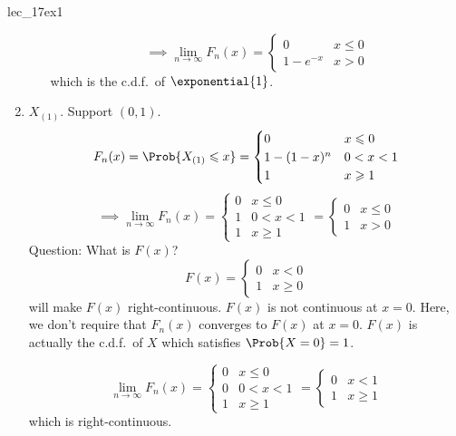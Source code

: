 \begin{Example}{}{lec_17ex1}
\begin{enumerate}[label=(\roman*)]
\begin{itemize}
                        \[ \implies
                            \lim\limits_{{n} \to {\infty}} F_n(x)=
                            \begin{cases}
                                0        & x\leqslant 0 \\
                                1-e^{-x} & x>0
                            \end{cases} \]
                        which is the c.d.f.\ of $ \exponential{1} $.
              \end{itemize}
        \item $ X_{(1)} $. Support $ (0,1) $.
              \[ F_n(x)=\Prob{X_{(1)}\leqslant x}=
                  \begin{cases}
                      0         & x\leqslant 0 \\
                      1-(1-x)^n & 0<x<1        \\
                      1         & x\geqslant 1
                  \end{cases} \]
              \[ \implies \lim\limits_{{n} \to {\infty}} F_n(x)=
                  \begin{cases}
                      0 & x\leqslant 0 \\
                      1 & 0<x<1        \\
                      1 & x\geqslant 1
                  \end{cases}=
                  \begin{cases}
                      0 & x\leqslant 0 \\
                      1 & x>0
                  \end{cases} \]
              Question: What is $ F(x) $?
              \[ F(x)=\begin{cases}
                      0 & x<0          \\
                      1 & x\geqslant 0
                  \end{cases} \]
              will make $ F(x) $ right-continuous.
              $ F(x) $ is not continuous at $ x=0 $.
              Here, we don't require that $ F_n(x) $ converges
              to $ F(x) $ at $ x=0 $. $ F(x) $
              is actually the c.d.f.\ of $ X $
              which satisfies $ \Prob{X=0}=1 $.

              \[ \lim\limits_{{n} \to {\infty}} F_n(x)=
                  \begin{cases}
                      0 & x\leqslant 0 \\
                      0 & 0<x<1        \\
                      1 & x\geqslant 1
                  \end{cases}=\begin{cases}
                      0 & x<1          \\
                      1 & x\geqslant 1
                  \end{cases} \]
              which is right-continuous.


\end{enumerate}
\end{Example}
